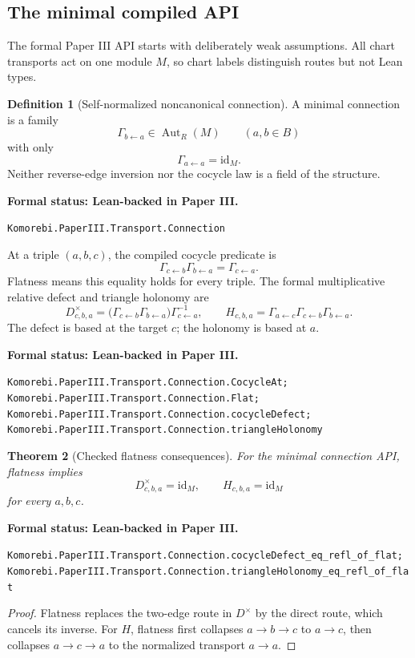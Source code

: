 \documentclass[11pt]{article}
\newtheorem{theorem}{Theorem}[section]
\theoremstyle{definition}
\newtheorem{definition}[theorem]{Definition}
\theoremstyle{remark}
\newcommand{\id}{\mathrm{id}}
\newcommand{\leanname}[1]{\nolinkurl{#1}}
\newcommand{\statusleanthree}[1]{%
  \par\smallskip\noindent
  {\color{leanblue}\textbf{Formal status: Lean-backed in Paper III.}}\par
  \begingroup\small\raggedright\leanname{#1}\par\endgroup\smallskip}
\begin{document}
\subsection{The minimal compiled API}

The formal Paper III API starts with deliberately weak assumptions.  All
chart transports act on one module $M$, so chart labels distinguish routes
but not Lean types.

\begin{definition}[Self-normalized noncanonical connection]
\label{def:minimal-connection}
A minimal connection is a family
\[
\Gamma_{b\leftarrow a}\in\operatorname{Aut}_R(M)
\qquad(a,b\in B)
\]
with only
\[
\Gamma_{a\leftarrow a}=\id_M.
\]
Neither reverse-edge inversion nor the cocycle law is a field of the
structure.
\end{definition}
\statusleanthree{Komorebi.PaperIII.Transport.Connection}

At a triple $(a,b,c)$, the compiled cocycle predicate is
\[
\Gamma_{c\leftarrow b}\Gamma_{b\leftarrow a}
=\Gamma_{c\leftarrow a}.
\]
Flatness means this equality holds for every triple.  The formal
multiplicative relative defect and triangle holonomy are
\[
D^\times_{c,b,a}
=
\bigl(\Gamma_{c\leftarrow b}\Gamma_{b\leftarrow a}\bigr)
\Gamma_{c\leftarrow a}^{-1},
\qquad
H_{c,b,a}
=
\Gamma_{a\leftarrow c}
\Gamma_{c\leftarrow b}
\Gamma_{b\leftarrow a}.
\]
The defect is based at the target $c$; the holonomy is based at $a$.
\statusleanthree{Komorebi.PaperIII.Transport.Connection.CocycleAt; Komorebi.PaperIII.Transport.Connection.Flat; Komorebi.PaperIII.Transport.Connection.cocycleDefect; Komorebi.PaperIII.Transport.Connection.triangleHolonomy}

\begin{theorem}[Checked flatness consequences]
\label{thm:minimal-flatness}
For the minimal connection API, flatness implies
\[
D^\times_{c,b,a}=\id_M,
\qquad
H_{c,b,a}=\id_M
\]
for every $a,b,c$.
\end{theorem}
\statusleanthree{Komorebi.PaperIII.Transport.Connection.cocycleDefect_eq_refl_of_flat; Komorebi.PaperIII.Transport.Connection.triangleHolonomy_eq_refl_of_flat}

\begin{proof}
Flatness replaces the two-edge route in $D^\times$ by the direct route,
which cancels its inverse.  For $H$, flatness first collapses $a\to b\to c$
to $a\to c$, then collapses $a\to c\to a$ to the normalized transport
$a\to a$.
\end{proof}
\end{document}
